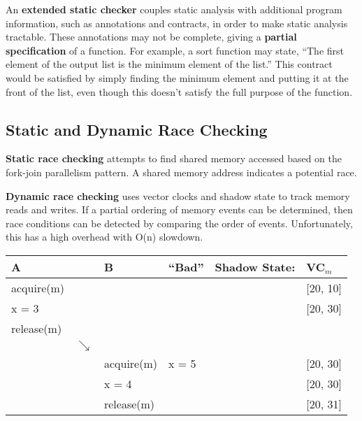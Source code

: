 \documentclass[twoside]{article}
\begin{document}
An \textbf{extended static checker} couples static analysis with additional
program information, such as annotations and contracts, in order to make static
analysis tractable. These annotations may not be complete, giving a
\textbf{partial specification} of a function. For example, a sort function may
state, ``The first element of the output list is the minimum element of the
list.'' This contract would be satisfied by simply finding the minimum element
and putting it at the front of the list, even though this doesn't satisfy the
full purpose of the function.

\subsection{Static and Dynamic Race Checking}

\textbf{Static race checking} attempts to find shared memory accessed based on
the fork-join parallelism pattern. A shared memory address indicates a potential
race.

\textbf{Dynamic race checking} uses vector clocks and shadow state to track
memory reads and writes. If a partial ordering of memory events can be
determined, then race conditions can be detected by comparing the order of
events. Unfortunately, this has a high overhead with O(n) slowdown.

\begin{table}[h]
\begin{tabular}{|l|l|l|l|l|l|}
\hline
A          &            & B          & ``Bad'' & Shadow State: & VC$_m$       \\ \hline
acquire(m) &            &            &         &               & {[}20, 10{]} \\
x = 3      &            &            &         &               & {[}20, 30{]} \\
release(m) &            &            &         &               &              \\
           & $\searrow$ &            &         &               &              \\
           &            & acquire(m) & x = 5   &               & {[}20, 30{]} \\
           &            & x = 4      &         &               & {[}20, 30{]} \\
           &            & release(m) &         &               & {[}20, 31{]} \\ \hline
\end{tabular}
\end{table}
\end{document}
